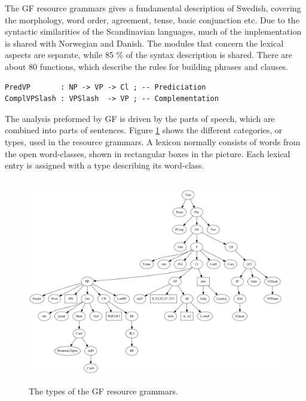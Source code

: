 \documentclass{report}
\begin{document}

The GF resource grammars gives a fundamental description of Swedish,
covering the morphology,
word order, agreement, tense, basic conjunction etc.
Due to the syntactic similarities of the Scandinavian languages, much of the implementation
is shared with Norwegian and Danish. The modules that concern the lexical
aspects are separate, while 85 \% of the syntax description is shared.
There are about 80 functions, which describe the rules for building phrases and clauses.
\begin{verbatim}
PredVP       : NP -> VP -> Cl ; -- Prediciation
ComplVPSlash : VPSlash  -> VP ; -- Complementation
\end{verbatim}
The analysis preformed by GF is driven by the parts of speech, which are combined into
parts of sentences.
Figure \ref{fig:gfpic} shows the different categories, or types, used in the
resource grammars. 
A lexicon normally consists of words from the open word-classes, shown in rectangular boxes in
the picture. Each lexical entry is assigned with a type describing its word-class.
\begin{figure}[h]
\includegraphics[height=90mm]{categories.png}
\caption{The types of the GF resource grammars.}
\label{fig:gfpic}
\end{figure}
\end{document}
